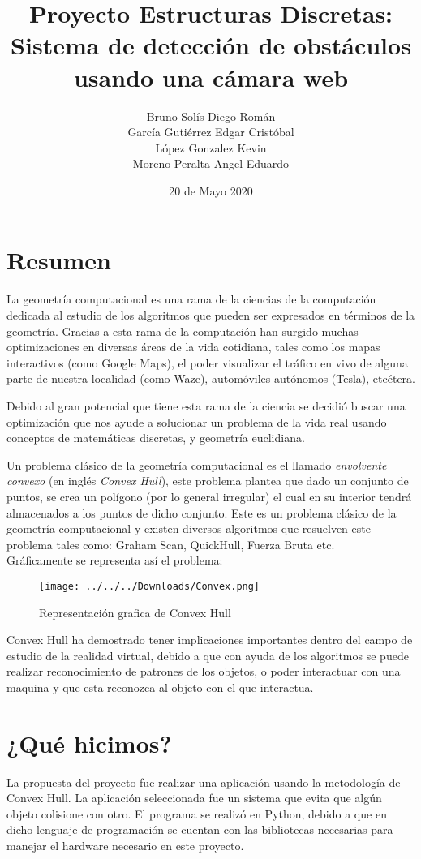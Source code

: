 \documentclass[12pt]{article}
\title{Proyecto Estructuras Discretas: Sistema de detección de obstáculos usando una cámara web}
\author{Bruno Solís Diego Román\\García Gutiérrez Edgar Cristóbal\\López Gonzalez Kevin\\Moreno Peralta Angel Eduardo }
\date{20 de Mayo 2020}
\begin{document}
\maketitle
\section{Resumen}
\noindent La geometría computacional es una rama de la ciencias de la computación dedicada al estudio de los algoritmos que pueden ser expresados en términos de la geometría. Gracias a esta rama de la computación han surgido muchas optimizaciones en diversas áreas de la vida cotidiana, tales como los mapas interactivos (como Google Maps), el poder visualizar el tráfico en vivo de alguna parte de nuestra localidad (como Waze), automóviles autónomos (Tesla), etcétera.

Debido al gran potencial que tiene esta rama de la ciencia se decidió buscar una optimización que nos ayude a solucionar un problema de la vida real usando conceptos de matemáticas discretas, y geometría euclidiana.

Un problema clásico de la geometría computacional es el llamado \textit{envolvente convexo} (en inglés \textit{Convex Hull}), este problema plantea que dado un conjunto de puntos, se crea un polígono (por lo general irregular) el cual en su interior tendrá almacenados a los puntos de dicho conjunto. Este es un problema clásico de la geometría computacional y existen diversos algoritmos que resuelven este problema tales como: Graham Scan, QuickHull, Fuerza Bruta etc.\\
Gráficamente se representa así el problema:
\begin{figure}[h]
\centering
\texttt{[image: ../../../Downloads/Convex.png]}
\caption{Representación grafica de Convex Hull}
\end{figure}

Convex Hull ha demostrado tener implicaciones importantes dentro del campo de estudio de la realidad virtual, debido a que con ayuda de los algoritmos se puede realizar reconocimiento de patrones de los objetos, o poder interactuar con una maquina y que esta reconozca al objeto con el que interactua.   
\section{¿Qué hicimos?}
\noindent La propuesta del proyecto fue realizar una aplicación usando la metodología de Convex Hull. La aplicación seleccionada fue un sistema que evita que algún objeto colisione con otro. El programa se realizó en Python, debido a que en dicho lenguaje de programación se cuentan con las bibliotecas necesarias para manejar el hardware necesario en este proyecto.
\end{document}
